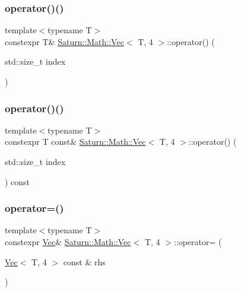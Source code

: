 \subsubsection{\texorpdfstring{operator()()}{operator()()}\hspace{0.1cm}{\footnotesize\ttfamily [1/2]}}
{\footnotesize\ttfamily template$<$typename T$>$ \\
constexpr T\& \mbox{\hyperlink{class_saturn_1_1_math_1_1_vec}{Saturn\+::\+Math\+::\+Vec}}$<$ T, 4 $>$\+::operator() (\begin{DoxyParamCaption}\item[{std\+::size\+\_\+t}]{index }\end{DoxyParamCaption})\hspace{0.3cm}{\ttfamily [inline]}}

\mbox{\label{class_saturn_1_1_math_1_1_vec_3_01_t_00_014_01_4_a3307c89974f686633a3045dd048a61e7}} 
\subsubsection{\texorpdfstring{operator()()}{operator()()}\hspace{0.1cm}{\footnotesize\ttfamily [2/2]}}
{\footnotesize\ttfamily template$<$typename T$>$ \\
constexpr T const\& \mbox{\hyperlink{class_saturn_1_1_math_1_1_vec}{Saturn\+::\+Math\+::\+Vec}}$<$ T, 4 $>$\+::operator() (\begin{DoxyParamCaption}\item[{std\+::size\+\_\+t}]{index }\end{DoxyParamCaption}) const\hspace{0.3cm}{\ttfamily [inline]}}

\mbox{\label{class_saturn_1_1_math_1_1_vec_3_01_t_00_014_01_4_a42bfbfee4b30f25a02ba93a427694340}} 
\subsubsection{\texorpdfstring{operator=()}{operator=()}}
{\footnotesize\ttfamily template$<$typename T$>$ \\
constexpr \mbox{\hyperlink{class_saturn_1_1_math_1_1_vec}{Vec}}\& \mbox{\hyperlink{class_saturn_1_1_math_1_1_vec}{Saturn\+::\+Math\+::\+Vec}}$<$ T, 4 $>$\+::operator= (\begin{DoxyParamCaption}\item[{\mbox{\hyperlink{class_saturn_1_1_math_1_1_vec}{Vec}}$<$ T, 4 $>$ const \&}]{rhs }\end{DoxyParamCaption})\hspace{0.3cm}{\ttfamily [inline]}}



